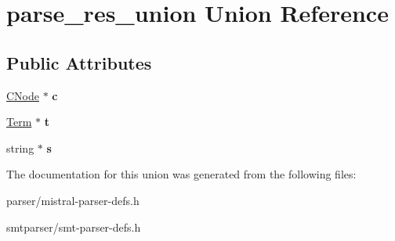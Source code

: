 \hypertarget{unionparse__res__union}{\section{parse\-\_\-res\-\_\-union \-Union \-Reference}
\label{unionparse__res__union}
}
\subsection*{\-Public \-Attributes}
\begin{DoxyCompactItemize}
\item 
\hypertarget{unionparse__res__union_aae9e9d66a34463b4a5f08724c9cb6f07}{\hyperlink{classCNode}{\-C\-Node} $\ast$ {\bfseries c}}\label{unionparse__res__union_aae9e9d66a34463b4a5f08724c9cb6f07}

\item 
\hypertarget{unionparse__res__union_a47eeb8862a489e7a539fea78f7315638}{\hyperlink{classTerm}{\-Term} $\ast$ {\bfseries t}}\label{unionparse__res__union_a47eeb8862a489e7a539fea78f7315638}

\item 
\hypertarget{unionparse__res__union_ab8d40a5315ced30ab697807bbf9e510d}{string $\ast$ {\bfseries s}}\label{unionparse__res__union_ab8d40a5315ced30ab697807bbf9e510d}

\end{DoxyCompactItemize}


\-The documentation for this union was generated from the following files\-:\begin{DoxyCompactItemize}
\item 
parser/mistral-\/parser-\/defs.\-h\item 
smtparser/smt-\/parser-\/defs.\-h\end{DoxyCompactItemize}
